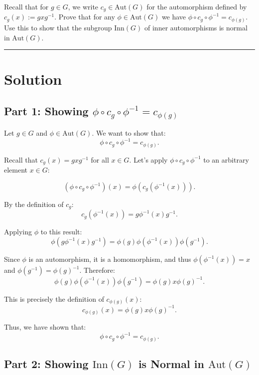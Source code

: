 \documentclass[12pt]{amsart}
\theoremstyle{definition}
\numberwithin{equation}{section}
\begin{document}
\begin{exercise}{2} Recall that for \(g \in G\), we write \(c_g \in \text{Aut}(G)\) for the automorphism defined by \(c_g(x) := gxg^{-1}\). Prove that for any \(\phi \in \text{Aut}(G)\) we have \(\phi \circ c_g \circ \phi^{-1} = c_{\phi(g)}\). Use this to show that the subgroup \(\text{Inn}(G)\) of inner automorphisms is normal in \(\text{Aut}(G)\). 
    \noindent\rule{\linewidth}{1pt}
    
    \section*{Solution}

    \subsection*{Part 1: Showing \(\phi \circ c_g \circ \phi^{-1} = c_{\phi(g)}\)}

    Let \(g \in G\) and \(\phi \in \text{Aut}(G)\). We want to show that:
    \[
    \phi \circ c_g \circ \phi^{-1} = c_{\phi(g)}.
    \]

    Recall that \(c_g(x) = gxg^{-1}\) for all \(x \in G\). Let's apply \(\phi \circ c_g \circ \phi^{-1}\) to an arbitrary element \(x \in G\):

    \[
    (\phi \circ c_g \circ \phi^{-1})(x) = \phi(c_g(\phi^{-1}(x))).
    \]

    By the definition of \(c_g\):
    \[
    c_g(\phi^{-1}(x)) = g \phi^{-1}(x) g^{-1}.
    \]

    Applying \(\phi\) to this result:
    \[
    \phi(g \phi^{-1}(x) g^{-1}) = \phi(g) \phi(\phi^{-1}(x)) \phi(g^{-1}).
    \]

    Since \(\phi\) is an automorphism, it is a homomorphism, and thus \(\phi(\phi^{-1}(x)) = x\) and \(\phi(g^{-1}) = \phi(g)^{-1}\). Therefore:
    \[
    \phi(g) \phi(\phi^{-1}(x)) \phi(g^{-1}) = \phi(g) x \phi(g)^{-1}.
    \]

    This is precisely the definition of \(c_{\phi(g)}(x)\):
    \[
    c_{\phi(g)}(x) = \phi(g) x \phi(g)^{-1}.
    \]

    Thus, we have shown that:
    \[
    \phi \circ c_g \circ \phi^{-1} = c_{\phi(g)}.
    \]

    \subsection*{Part 2: Showing \(\text{Inn}(G)\) is Normal in \(\text{Aut}(G)\)}


\end{exercise}
\end{document}
